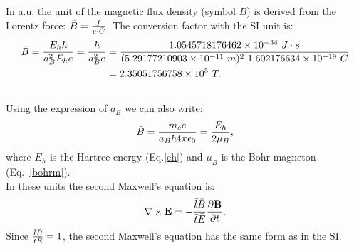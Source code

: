 \documentclass[12pt,a4paper]{article}
\def\hbarf{1.0545718176462\times 10^{-34}}
\def\barl{5.29177210903\times 10^{-11}}
\def\barc{1.602176634\times 10^{-19}}
\def\barb{2.35051756758\times 10^{5}}
\begin{document}
{\color{web-blue} In a.u. the unit of the magnetic flux density 
(symbol $\bar B$) is derived from the Lorentz force: 
$\bar B= {\bar f \over \bar v \cdot
\bar C}$. The conversion factor with the SI unit is:
\begin{align}
\bar B = {E_h \hbar \over a_B^2 E_h e}={\hbar \over a_B^2 e}&=
{\hbarf\ J\cdot s \over (\barl\ m)^2\ \barc\ C}\nonumber
\\&= \barb\ T.
\end{align}
\\

Using the expression of $a_B$ we can also write:
\begin{equation}
\bar B= {m_e e \over a_B \hbar 4 \pi \epsilon_0}=
{E_h \over 2 \mu_B},
\end{equation}
where $E_h$ is the Hartree energy (Eq.\ref{eh}) and $\mu_B$ is the Bohr 
magneton (Eq.~\ref{bohrm}).
\\
In these units the second Maxwell's equation is:
\begin{equation}
\nabla \times {\bf E}=-{\bar l \bar B \over \bar t \bar E} 
{\partial {\bf B} \over \partial t}.
\label{maxwell2gen}
\end{equation}
Since ${\bar l \bar B \over \bar t \bar E}=1$, the second Maxwell's
equation has the same form as in the SI.
}
\\
\end{document}
